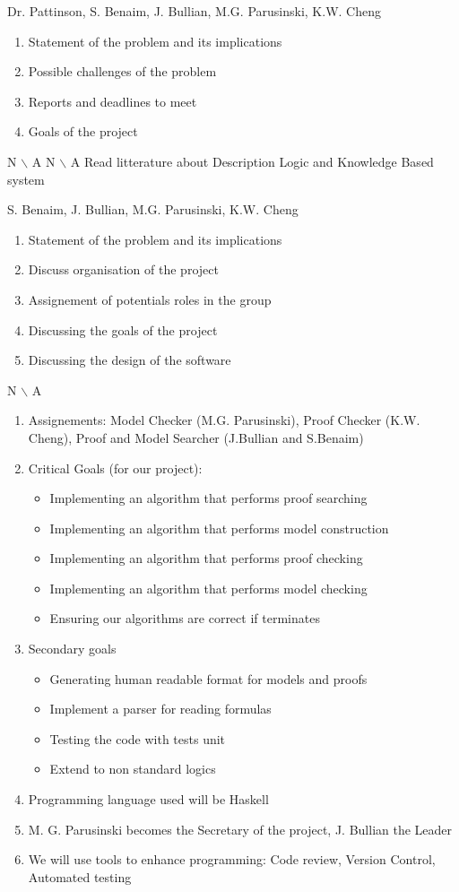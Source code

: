 %
{Dr. Pattinson, S. Benaim, J. Bullian, M.G. Parusinski, K.W. Cheng}%
{ \begin{enumerate} \item Statement of the problem and its implications 
 \item Possible challenges of the problem 
 \item Reports and deadlines to meet 
 \item Goals of the project 
\end{enumerate} }%
{ N $\backslash$ A}%
{ N $\backslash$ A}%
{ Read litterature about Description Logic and Knowledge Based system}

%
{S. Benaim, J. Bullian, M.G. Parusinski, K.W. Cheng}%
{ \begin{enumerate} \item Statement of the problem and its implications 
 \item Discuss organisation of the project 
 \item Assignement of potentials roles in the group
 \item Discussing the goals of the project
 \item Discussing the design of the software 
\end{enumerate} }%
{N $\backslash$ A}
{ \begin{enumerate}
\item Assignements: Model Checker (M.G. Parusinski), Proof Checker (K.W. Cheng),
Proof and Model Searcher (J.Bullian and S.Benaim)
\item Critical Goals (for our project):
\begin{itemize}
\item Implementing an algorithm that performs proof searching
\item Implementing an algorithm that performs model construction
\item Implementing an algorithm that performs proof checking
\item Implementing an algorithm that performs model checking
\item Ensuring our algorithms are correct if terminates
\end{itemize}
\item Secondary goals \begin{itemize}
\item Generating human readable format for models and proofs
\item Implement a parser for reading formulas
\item Testing the code with tests unit
\item Extend to non standard logics
\end{itemize}
\item Programming language used will be Haskell
\item M. G. Parusinski becomes the Secretary of the project, J. Bullian the Leader
\item We will use tools to enhance programming: Code review, Version Control, Automated testing
\end{enumerate} }%
